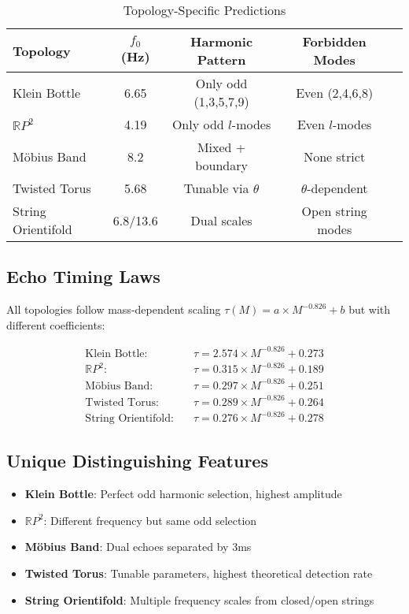 \documentclass[11pt,a4paper]{article}
\begin{document}
\begin{table}[H]
\centering
\caption{Topology-Specific Predictions}
\begin{tabular}{@{}lcccc@{}}
\toprule
\textbf{Topology} & \textbf{$f_0$ (Hz)} & \textbf{Harmonic Pattern} & \textbf{Forbidden Modes} \\
\midrule
Klein Bottle & 6.65 & Only odd (1,3,5,7,9) & Even (2,4,6,8) \\
$\mathbb{R}P^2$ & 4.19 & Only odd $l$-modes & Even $l$-modes \\
Möbius Band & 8.2 & Mixed + boundary & None strict \\
Twisted Torus & 5.68 & Tunable via $\theta$ & $\theta$-dependent \\
String Orientifold & 6.8/13.6 & Dual scales & Open string modes \\
\bottomrule
\end{tabular}
\label{tab:topology_predictions}
\end{table}

\subsection{Echo Timing Laws}

All topologies follow mass-dependent scaling $\tau(M) = a \times M^{-0.826} + b$ but with different coefficients:

\begin{align}
\text{Klein Bottle:} \quad &\tau = 2.574 \times M^{-0.826} + 0.273 \\
\mathbb{R}P^2: \quad &\tau = 0.315 \times M^{-0.826} + 0.189 \\
\text{Möbius Band:} \quad &\tau = 0.297 \times M^{-0.826} + 0.251 \\
\text{Twisted Torus:} \quad &\tau = 0.289 \times M^{-0.826} + 0.264 \\
\text{String Orientifold:} \quad &\tau = 0.276 \times M^{-0.826} + 0.278
\end{align}

\subsection{Unique Distinguishing Features}

\begin{itemize}
    \item \textbf{Klein Bottle}: Perfect odd harmonic selection, highest amplitude
    \item \textbf{$\mathbb{R}P^2$}: Different frequency but same odd selection
    \item \textbf{Möbius Band}: Dual echoes separated by 3ms
    \item \textbf{Twisted Torus}: Tunable parameters, highest theoretical detection rate
    \item \textbf{String Orientifold}: Multiple frequency scales from closed/open strings
\end{itemize}
\end{document}
